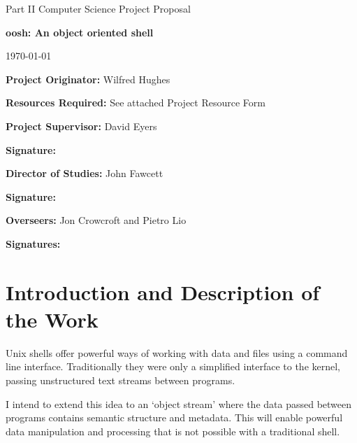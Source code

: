 \documentclass[12pt]{article}
\begin{document}
\thispagestyle{empty}

\medskip
{}
\medskip
{}

\vfil

\centerline{\large Part II Computer Science Project Proposal}
\vspace{0.4in}
\centerline{\Large\bf oosh: An object oriented shell}
\vspace{0.3in}
\centerline{\large \today}

\vfil

{\bf Project Originator:} Wilfred Hughes

\vspace{0.1in}

{\bf Resources Required:} See attached Project Resource Form

\vspace{0.5in}

{\bf Project Supervisor:} David Eyers

\vspace{0.2in}

{\bf Signature:}

\vspace{0.5in}

{\bf Director of Studies:}  John Fawcett

\vspace{0.2in}

{\bf Signature:}

\vspace{0.5in}

{\bf Overseers:} Jon Crowcroft and Pietro Lio

\vspace{0.2in}

{\bf Signatures:}

\vfil
\eject

\section*{Introduction and Description of the Work}
Unix shells offer powerful ways of working with data and files using a
command line interface. Traditionally they were only a simplified interface
to the kernel, passing unstructured text streams between programs.

I intend to extend this idea to an `object stream' where the data
passed between programs contains semantic structure and metadata. This
will enable powerful data manipulation and processing that is not
possible with a traditional shell.
\end{document}
